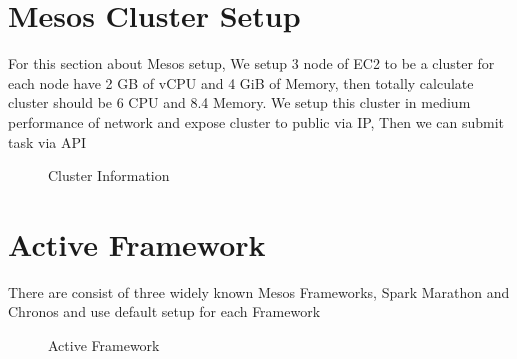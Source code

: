 \documentclass[12pt,oneside,openright,a4paper]{cpe-english-project}
\begin{document}
\section{Mesos Cluster Setup}
	For this section about Mesos setup, We setup 3 node of EC2 to be a cluster for each node have 2 GB of vCPU and 4 GiB of Memory, then totally calculate cluster should be 6 CPU and 8.4 Memory. We setup this cluster in medium performance of network and expose cluster to public via IP, Then we can submit task via API
	\begin{figure}[!h]\centering
    \setlength{\fboxrule}{0mm} %
    \setlength{\fboxsep}{0cm}
    \caption{Cluster Information}\label{fig:cluster_setup}
    \end{figure}

\section{Active Framework}
     There are consist of three widely known Mesos Frameworks, Spark Marathon and Chronos and use default setup for each Framework
	\begin{figure}[!h]\centering
    \setlength{\fboxrule}{0mm} %
    \setlength{\fboxsep}{0cm}
    \caption{Active Framework}\label{fig:Framework}
    \end{figure}
    
\end{document}

